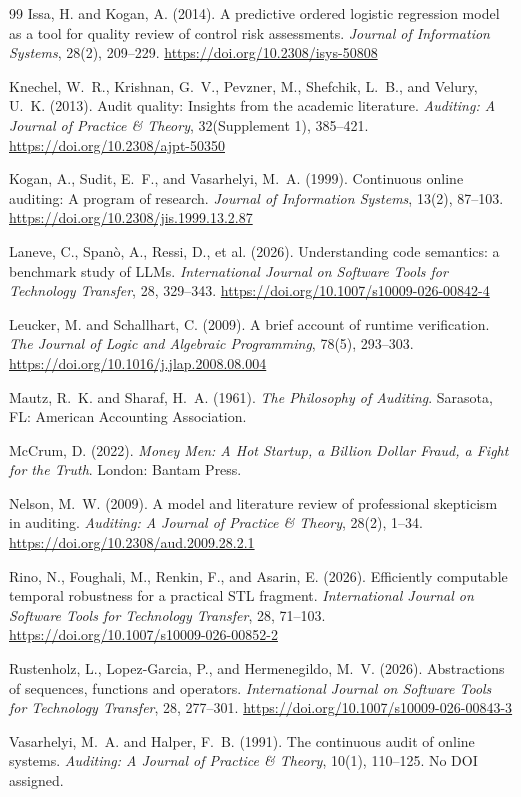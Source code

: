 \documentclass[smallcondensed,envcountsect,natbib]{svjour3}
\begin{document}
\begin{thebibliography}{99}
Issa, H. and Kogan, A. (2014).
A predictive ordered logistic regression model as a tool for quality review of control risk assessments.
\emph{Journal of Information Systems}, 28(2), 209--229. \url{https://doi.org/10.2308/isys-50808}

Knechel, W.~R., Krishnan, G.~V., Pevzner, M., Shefchik, L.~B., and Velury, U.~K. (2013).
Audit quality: Insights from the academic literature.
\emph{Auditing: A Journal of Practice \& Theory}, 32(Supplement 1), 385--421. \url{https://doi.org/10.2308/ajpt-50350}

Kogan, A., Sudit, E.~F., and Vasarhelyi, M.~A. (1999).
Continuous online auditing: A program of research.
\emph{Journal of Information Systems}, 13(2), 87--103. \url{https://doi.org/10.2308/jis.1999.13.2.87}

Laneve, C., Span\`o, A., Ressi, D., et al. (2026).
Understanding code semantics: a benchmark study of LLMs.
\emph{International Journal on Software Tools for Technology Transfer}, 28, 329--343. \url{https://doi.org/10.1007/s10009-026-00842-4}

Leucker, M. and Schallhart, C. (2009).
A brief account of runtime verification.
\emph{The Journal of Logic and Algebraic Programming}, 78(5), 293--303. \url{https://doi.org/10.1016/j.jlap.2008.08.004}

Mautz, R.~K. and Sharaf, H.~A. (1961).
\emph{The Philosophy of Auditing}.
Sarasota, FL: American Accounting Association.

McCrum, D. (2022).
\emph{Money Men: A Hot Startup, a Billion Dollar Fraud, a Fight for the Truth}.
London: Bantam Press.

Nelson, M.~W. (2009).
A model and literature review of professional skepticism in auditing.
\emph{Auditing: A Journal of Practice \& Theory}, 28(2), 1--34. \url{https://doi.org/10.2308/aud.2009.28.2.1}

Rino, N., Foughali, M., Renkin, F., and Asarin, E. (2026).
Efficiently computable temporal robustness for a practical STL fragment.
\emph{International Journal on Software Tools for Technology Transfer}, 28, 71--103. \url{https://doi.org/10.1007/s10009-026-00852-2}

Rustenholz, L., Lopez-Garcia, P., and Hermenegildo, M.~V. (2026).
Abstractions of sequences, functions and operators.
\emph{International Journal on Software Tools for Technology Transfer}, 28, 277--301. \url{https://doi.org/10.1007/s10009-026-00843-3}

Vasarhelyi, M.~A. and Halper, F.~B. (1991).
The continuous audit of online systems.
\emph{Auditing: A Journal of Practice \& Theory}, 10(1), 110--125. No DOI assigned.

\end{thebibliography}
\end{document}
